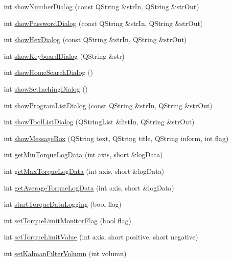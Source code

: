 \begin{DoxyCompactItemize}
\item 
int \hyperlink{classCUIApp_a9d18970cff5ce1265a65098c5a866dcb}{show\-Number\-Dialog} (const Q\-String \&str\-In, Q\-String \&str\-Out)
\item 
int \hyperlink{classCUIApp_a8cec29d70ac25427f29b774ba441202c}{show\-Password\-Dialog} (const Q\-String \&str\-In, Q\-String \&str\-Out)
\item 
int \hyperlink{classCUIApp_a8601870e0a38673fb01b2c4434370f5b}{show\-Hex\-Dialog} (const Q\-String \&str\-In, Q\-String \&str\-Out)
\item 
int \hyperlink{classCUIApp_a88513c30feec1d4fe8066371ca112d71}{show\-Keyboard\-Dialog} (Q\-String \&str)
\item 
int \hyperlink{classCUIApp_ae2633f43e94dfb880ff1277699226519}{show\-Home\-Search\-Dialog} ()
\item 
int \hyperlink{classCUIApp_aaa47294e1b6c6c671c5c0bdd94091a83}{show\-Set\-Inching\-Dialog} ()
\item 
int \hyperlink{classCUIApp_a13a1b4f0cc4b06e300cec033532735b7}{show\-Program\-List\-Dialog} (const Q\-String \&str\-In, Q\-String \&str\-Out)
\item 
int \hyperlink{classCUIApp_acbf0b1852db17135f77005cc75bf40d9}{show\-Tool\-List\-Dialog} (Q\-String\-List \&list\-In, Q\-String \&str\-Out)
\item 
int \hyperlink{classCUIApp_ad4732c371c796476076b4ef609479e5f}{show\-Message\-Box} (Q\-String text, Q\-String title, Q\-String inform, int flag)
\item 
int \hyperlink{classCUIApp_aa3d417803b6914e8b5b9d7ddb58d4efd}{get\-Min\-Torque\-Log\-Data} (int axis, short \&log\-Data)
\item 
int \hyperlink{classCUIApp_a43b0348d921203b6d15874b3f56a8298}{get\-Max\-Torque\-Log\-Data} (int axis, short \&log\-Data)
\item 
int \hyperlink{classCUIApp_a5c062b76fb34f6585138cecfddecaebf}{get\-Average\-Torque\-Log\-Data} (int axis, short \&log\-Data)
\item 
int \hyperlink{classCUIApp_a13fb4cbbb6da8eaddd3559291346a17d}{start\-Torque\-Data\-Logging} (bool flag)
\item 
int \hyperlink{classCUIApp_a316cae00cda86a676ec0dc350b0f985e}{set\-Torque\-Limit\-Monitor\-Flag} (bool flag)
\item 
int \hyperlink{classCUIApp_a2817d696dbe549b3e5024b5710c36aaa}{set\-Torque\-Limit\-Value} (int axis, short positive, short negative)
\item 
int \hyperlink{classCUIApp_afec821ab1d2fbe6c56f3824e9eca0452}{set\-Kalman\-Filter\-Volumn} (int volumn)

\end{DoxyCompactItemize}
